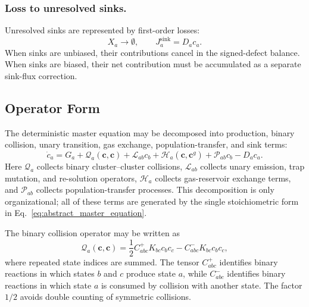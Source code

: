 \subsubsection*{Loss to unresolved sinks.}

Unresolved sinks are represented by first-order losses:
\begin{equation}
    X_a \longrightarrow \emptyset,
    \qquad
    J_a^{\mathrm{sink}} = D_a c_a .
    \label{eq:sink_loss_general}
\end{equation}
When sinks are unbiased, their contributions cancel in the signed-defect
balance. When sinks are biased, their net contribution must be accumulated as a
separate sink-flux correction.

\subsection{Operator Form}
\label{sec:operator_form}

The deterministic master equation may be decomposed into production, binary
collision, unary transition, gas exchange, population-transfer, and sink terms:
\begin{equation}
    \dot{c}_a
    =
    G_a
    +
    \mathcal{Q}_a(\mathbf{c},\mathbf{c})
    +
    \mathcal{L}_{ab}c_b
    +
    \mathcal{H}_a(\mathbf{c},\mathbf{c}^g)
    +
    \mathcal{P}_{ab}c_b
    -
    D_a c_a .
    \label{eq:deterministic_operator_decomposition}
\end{equation}
Here $\mathcal{Q}_a$ collects binary cluster--cluster collisions,
$\mathcal{L}_{ab}$ collects unary emission, trap mutation, and re-solution
operators, $\mathcal{H}_a$ collects gas-reservoir exchange terms, and
$\mathcal{P}_{ab}$ collects population-transfer processes. This decomposition
is only organizational; all of these terms are generated by the single
stoichiometric form in Eq.~\eqref{eq:abstract_master_equation}.

The binary collision operator may be written as
\begin{equation}
    \mathcal{Q}_a(\mathbf{c},\mathbf{c})
    =
    \frac{1}{2}C^+_{abc}K_{bc}c_b c_c
    -
    C^-_{abc}K_{bc}c_b c_c,
    \label{eq:binary_collision_operator}
\end{equation}
where repeated state indices are summed. The tensor $C^+_{abc}$ identifies
binary reactions in which states $b$ and $c$ produce state $a$, while
$C^-_{abc}$ identifies binary reactions in which state $a$ is consumed by
collision with another state. The factor $1/2$ avoids double counting of
symmetric collisions.

